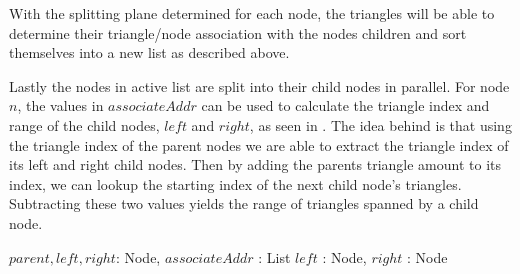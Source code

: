 With the splitting plane determined for each node, the triangles will be able to
determine their triangle/node association with the nodes children and sort
themselves into a new list as described above.


Lastly the nodes in active list are split into their child nodes in
parallel. For node $n$, the values in $associateAddr$ can be used to calculate
the triangle index and range of the child nodes, $left$ and $right$, as seen in
. The idea behind  is that
using the triangle index of the parent nodes we are able to extract the triangle
index of its left and right child nodes. Then by adding the parents triangle
amount to its index, we can lookup the starting index of the next child node's
triangles. Subtracting these two values yields the range of triangles spanned by
a child node.

\begin{algorithm}
  \caption{Compute child node triangle index and range}
  \label{alg:childIndices}
  \begin{algorithmic}
              {$parent, left, right$: Node, $associateAddr$ : List}
              {$left$ : Node, $right$ : Node}{
              }
  \end{algorithmic}
\end{algorithm}







